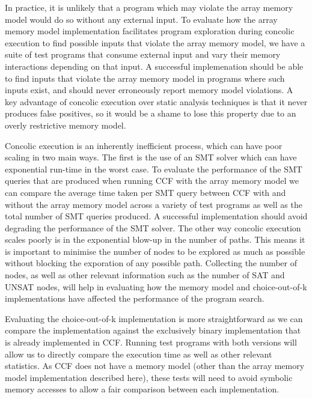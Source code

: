 \documentclass[12pt,twoside]{report}
\begin{document}
In practice, it is unlikely that a program which may violate the array memory model would do so without any external input. To evaluate how the array memory model implementation facilitates program exploration during concolic execution to find possible inputs that violate the array memory model, we have a suite of test programs that consume external input and vary their memory interactions depending on that input. A successful implemenation should be able to find inputs that violate the array memory model in programs where such inputs exist, and should never erroneously report memory model violations. A key advantage of concolic execution over static analysis techniques is that it never produces false positives, so it would be a shame to lose this property due to an overly restrictive memory model.

Concolic execution is an inherently inefficient process, which can have poor scaling in two main ways. The first is the use of an SMT solver which can have exponential run-time in the worst case. To evaluate the performance of the SMT queries that are produced when running CCF with the array memory model we can compare the average time taken per SMT query between CCF with and without the array memory model across a variety of test programs as well as the total number of SMT queries produced. A successful implementation should avoid degrading the performance of the SMT solver. The other way concolic execution scales poorly is in the exponential blow-up in the number of paths. This means it is important to minimise the number of nodes to be explored as much as possible without blocking the exporation of any possible path. Collecting the number of nodes, as well as other relevant information such as the number of SAT and UNSAT nodes, will help in evaluating how the memory model and choice-out-of-k implementations have affected the performance of the program search.

Evaluating the choice-out-of-k implementation is more straightforward as we can compare the implementation against the exclusively binary implementation that is already implemented in CCF. Running test programs with both versions will allow us to directly compare the execution time as well as other relevant statistics. As CCF does not have a memory model (other than the array memory model implementation described here), these tests will need to avoid symbolic memory accesses to allow a fair comparison between each implementation.
\end{document}

